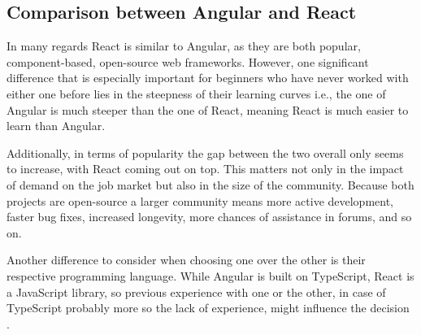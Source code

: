 \subsection{Comparison between Angular and React}
In many regards React is similar to Angular, as they are both popular, component-based, open-source web frameworks. However, one 
significant difference that is especially important for beginners who have never worked with either one before lies in the 
steepness of their learning curves i.e., the one of Angular is much steeper than the one of React, meaning React is much easier 
to learn than Angular.

Additionally, in terms of popularity the gap between the two overall only seems to increase, with React coming out on top. This 
matters not only in the impact of demand on the job market but also in the size of the community. Because both projects are 
open-source a larger community means more active development, faster bug fixes, increased longevity, more chances of assistance 
in forums, and so on.

Another difference to consider when choosing one over the other is their respective programming language. While Angular is built
on TypeScript, React is a JavaScript library, so previous experience with one or the other, in case of TypeScript probably
more so the lack of experience, might influence the decision \cite{AngularReactComparison}.

